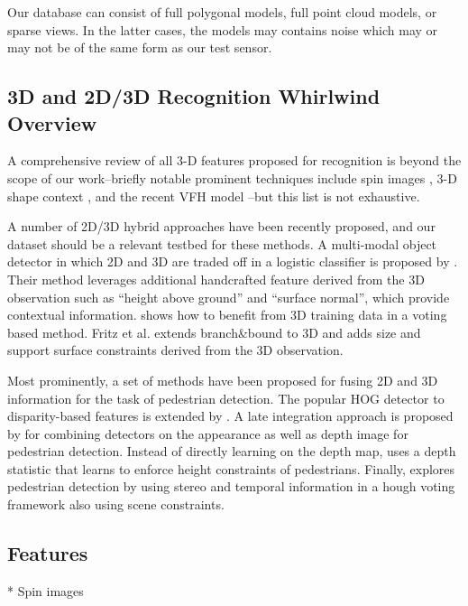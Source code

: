 Our database can consist of full polygonal models, full point cloud models, or sparse views.
In the latter cases, the models may contains noise which may or may not be of the same form as our test sensor.


\subsection{3D and 2D/3D Recognition Whirlwind Overview}
\label{sec:2d-3d}
A comprehensive review of all 3-D features proposed for recognition is beyond the scope of our work--briefly notable prominent techniques include spin images \cite{spin}, 3-D shape context \cite{Frome3DSC}, and the recent VFH model \cite{RaduVFH}--but this list is not exhaustive. 

A number of 2D/3D hybrid approaches have been recently proposed, and our dataset should be a relevant testbed for these methods. A multi-modal object detector in which 2D and 3D are traded off in a logistic classifier is proposed by \cite{gould08eccv}. Their method leverages additional handcrafted feature derived from the 3D observation such as ``height above ground'' and ``surface normal'', which provide contextual information.
\cite{Sun2010} shows how to benefit from 3D training data in a voting based method.
Fritz et al. \cite{Fritz2010} extends branch\&bound to 3D and adds size and support surface constraints derived from the 3D observation.

Most prominently, a set of methods have been proposed for fusing 2D and 3D information for the task of pedestrian detection.
The popular HOG detector \cite{Dalal2005} to disparity-based features is extended by \cite{hattori}.
A late integration approach is proposed by \cite{rohrbach09dagm} for combining detectors on the appearance as well as depth image for pedestrian detection.
Instead of directly learning on the depth map, \cite{walk10eccv} uses a depth statistic that learns to enforce height constraints of pedestrians.
Finally, \cite{leibe10ijrr} explores pedestrian detection by using stereo and temporal information in a hough voting framework also using scene constraints.

\subsection{Features}

* Spin images \cite{Johnson1999}

